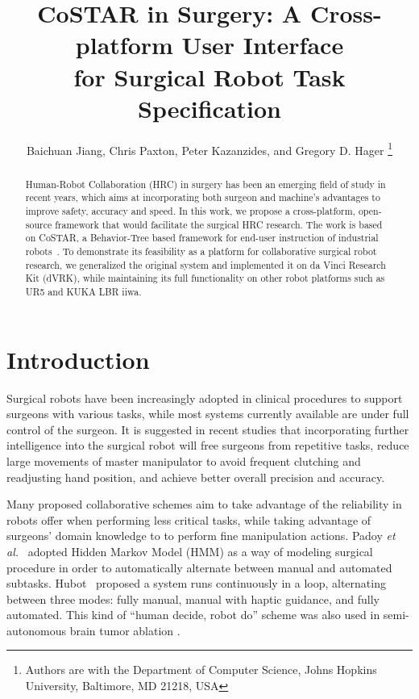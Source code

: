 \documentclass[letterpaper, 10 pt, conference]{ieeeconf}
\title{\huge \bf
CoSTAR in Surgery: A Cross-platform User Interface \\for Surgical Robot Task Specification
}
\author{Baichuan Jiang, Chris Paxton, Peter Kazanzides, and Gregory D. Hager
\thanks{Authors are with the Department of Computer Science, Johns Hopkins University,
        Baltimore, MD 21218, USA}
}
\begin{document}
\maketitle
\thispagestyle{empty}
\pagestyle{empty}


\newcommand{\fix}[1]{{\color{red} \textbf{[FIX: #1]}}}
\newcommand{\todo}[2]{{\color{blue} \textbf{[TODO(#1): #2]}}}

\begin{abstract}

Human-Robot Collaboration (HRC) in surgery has been an emerging field of study in recent years, which aims at incorporating both surgeon and machine's advantages to improve safety, accuracy and speed. In this work, we propose a cross-platform, open-source framework that would facilitate the surgical HRC research. The work is based on CoSTAR, a Behavior-Tree based framework for end-user instruction of industrial robots~\cite{paxton2017costar}. To demonstrate its feasibility as a platform for collaborative surgical robot research, we generalized the original system and implemented it on da Vinci Research Kit (dVRK), while maintaining its full functionality on other robot platforms such as UR5 and KUKA LBR iiwa.  

\end{abstract}


\section{Introduction}

Surgical robots have been increasingly adopted in clinical procedures to support surgeons with various tasks, while most systems currently available are under full control of the surgeon. It is suggested in recent studies \cite{padoy2011human,berthet2016hubot,bauzano2016collaborative,hu2015semi} that incorporating further intelligence into the surgical robot will free surgeons from repetitive tasks, reduce large movements of master manipulator to avoid frequent clutching and readjusting hand position, and achieve better overall precision and accuracy. 

Many proposed collaborative schemes aim to take advantage of the reliability in robots offer when performing less critical tasks, while taking advantage of surgeons' domain knowledge to to perform fine manipulation actions. Padoy \textit{et al.}~\cite{padoy2011human} adopted Hidden Markov Model (HMM) as a way of modeling surgical procedure in order to automatically alternate between manual and automated subtasks. Hubot~\cite{berthet2016hubot} proposed a system runs continuously in a loop, alternating between three modes: fully manual, manual with haptic guidance, and fully automated. This kind of ``human decide, robot do'' scheme was also used in semi-autonomous brain tumor ablation \cite{hu2015semi}.
\end{document}
